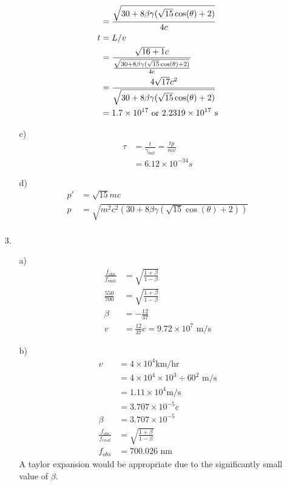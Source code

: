 \documentclass{article}
\begin{document}
\begin{itemize}
\begin{itemize}
\begin{align*}
            &=\frac{\sqrt{30+8\beta\gamma(\sqrt{15}\cos(\theta)+2)}}{4c}\\
            t&=L/v\\
            &=\frac{\sqrt{16+1}c}{\frac{\sqrt{30+8\beta\gamma(\sqrt{15}\cos(\theta)+2)}}{4c}}\\
            &=\frac{4\sqrt{17}c^2}{\sqrt{30+8\beta\gamma(\sqrt{15}\cos(\theta)+2)}}\\
            &=1.7\times 10^{17} \text{ or } 2.2319 \times 10^{17} \textsl{ s}
        \end{align*}
        \item [c)]
        \begin{align*}
            \tau&=\frac{t}{\gamma_{ball}}=\frac{tp}{mv}\\
            &=6.12\times 10^{-34} s
        \end{align*}
        \item [d)]
        \begin{align*}
            p' &= \sqrt{15}mc\\
            p &=\sqrt{m^2c^2(30+8\beta\gamma(\sqrt{15}\cos(\theta)+2))}\\
        \end{align*}
    \end{itemize}
    \item [3.]
    \begin{itemize}
        \item [a)]
        \begin{align*}
            \frac{f_{\text{obs}}}{f_{\text{emit}}}&=\sqrt{\frac{1+\beta}{1-\beta}}\\
            \frac{550}{700}&=\sqrt{\frac{1+\beta}{1-\beta}}\\
            \beta &=-\frac{12}{37}\\
            v&=\frac{12}{37}c=9.72\times 10^7\text{ m/s}
        \end{align*}
        
        \item [b)]
        \begin{align*}
            v&=4\times 10^4 \text{km/hr}\\
            &=4\times 10^4 \times 10^3 \div60^2 \text{ m/s}\\
            &=1.11\times 10^4 \text{m/s}\\
            &=3.707\times 10^{-5} c\\
            \beta &=3.707\times 10^{-5}\\
            \frac{f_{obs}}{f_{emit}}&=\sqrt{\frac{1+\beta}{1-\beta}}\\
            f_{obs}&=700.026 \text{ nm}
        \end{align*}
        A taylor expansion would be appropriate due to the significantly small value of \(\beta\).
    \end{itemize}
\end{itemize}
\end{document}
